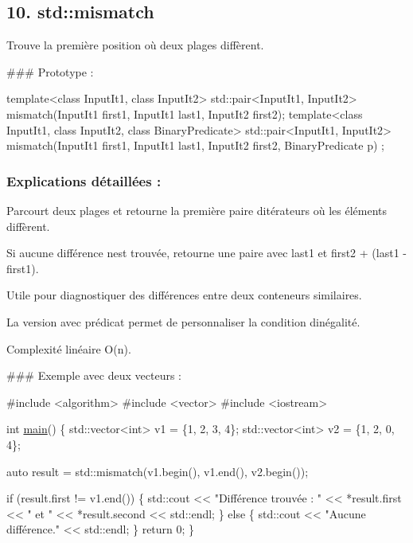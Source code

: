 \subsection*{10. {\bfseries std\+::mismatch}}

Trouve la première position où deux plages diffèrent.

\#\#\# Prototype \+: 
\begin{DoxyCode}
\textcolor{keyword}{template}<\textcolor{keyword}{class} InputIt1, \textcolor{keyword}{class} InputIt2>
std::pair<InputIt1, InputIt2> mismatch(InputIt1 first1, InputIt1 last1, InputIt2 first2);
\textcolor{keyword}{template}<\textcolor{keyword}{class} InputIt1, \textcolor{keyword}{class} InputIt2, \textcolor{keyword}{class} BinaryPredicate>
std::pair<InputIt1, InputIt2> mismatch(InputIt1 first1, InputIt1 last1, InputIt2 first2, BinaryPredicate p)
      ;
\end{DoxyCode}


\subsubsection*{Explications détaillées \+:}


\begin{DoxyItemize}
\item Parcourt deux plages et retourne la première paire d\textquotesingle{}itérateurs où les éléments diffèrent.
\item Si aucune différence n\textquotesingle{}est trouvée, retourne une paire avec {\ttfamily last1} et {\ttfamily first2 + (last1 -\/ first1)}.
\item Utile pour diagnostiquer des différences entre deux conteneurs similaires.
\item La version avec prédicat permet de personnaliser la condition d\textquotesingle{}inégalité.
\item Complexité linéaire O(n).
\end{DoxyItemize}

\#\#\# Exemple avec deux vecteurs \+: 
\begin{DoxyCode}
\textcolor{preprocessor}{#include <algorithm>}
\textcolor{preprocessor}{#include <vector>}
\textcolor{preprocessor}{#include <iostream>}

\textcolor{keywordtype}{int} \hyperlink{htop_8c_a3c04138a5bfe5d72780bb7e82a18e627}{main}() \{
    std::vector<int> v1 = \{1, 2, 3, 4\};
    std::vector<int> v2 = \{1, 2, 0, 4\};

    \textcolor{keyword}{auto} result = std::mismatch(v1.begin(), v1.end(), v2.begin());

    \textcolor{keywordflow}{if} (result.first != v1.end()) \{
        std::cout << \textcolor{stringliteral}{"Différence trouvée : "} << *result.first << \textcolor{stringliteral}{" et "} << *result.second << std::endl;
    \} \textcolor{keywordflow}{else} \{
        std::cout << \textcolor{stringliteral}{"Aucune différence."} << std::endl;
    \}
    \textcolor{keywordflow}{return} 0;
\}
\end{DoxyCode}
 



